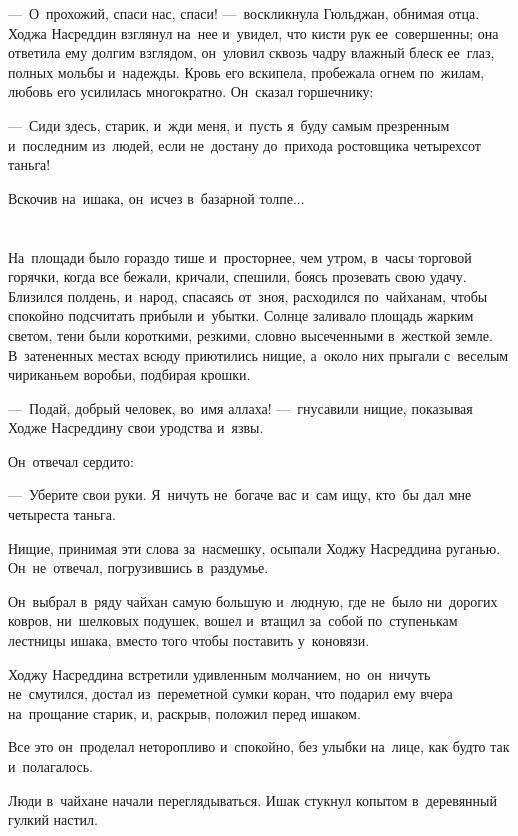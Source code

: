 \documentclass[12pt,a4paper]{book}
\begin{document}
—~О~прохожий, спаси нас, спаси! —~воскликнула Гюльджан, обнимая отца. Ходжа Насреддин взглянул на~нее и~увидел, что кисти рук ее~совершенны; она ответила ему долгим взглядом, он~уловил сквозь чадру влажный блеск ее~глаз, полных мольбы и~надежды. Кровь его вскипела, пробежала огнем по~жилам, любовь его усилилась многократно. Он~сказал горшечнику:

—~Сиди здесь, старик, и~жди меня, и~пусть я~буду самым презренным и~последним из~людей, если не~достану до~прихода ростовщика четырехсот таньга!

Вскочив на~ишака, он~исчез в~базарной толпе...


\chapter{}

На~площади было гораздо тише и~просторнее, чем утром, в~часы торговой горячки, когда все бежали, кричали, спешили, боясь прозевать свою удачу. Близился полдень, и~народ, спасаясь от~зноя, расходился по~чайханам, чтобы спокойно подсчитать прибыли и~убытки. Солнце заливало площадь жарким светом, тени были короткими, резкими, словно высеченными в~жесткой земле. В~затененных местах всюду приютились нищие, а~около них прыгали с~веселым чириканьем воробьи, подбирая крошки.

—~Подай, добрый человек, во~имя аллаха! —~гнусавили нищие, показывая Ходже Насреддину свои уродства и~язвы.

Он~отвечал сердито:

—~Уберите свои руки. Я~ничуть не~богаче вас и~сам ищу, кто~бы дал мне четыреста таньга.

Нищие, принимая эти слова за~насмешку, осыпали Ходжу Насреддина руганью. Он~не~отвечал, погрузившись в~раздумье.

Он~выбрал в~ряду чайхан самую большую и~людную, где не~было ни~дорогих ковров, ни~шелковых подушек, вошел и~втащил за~собой по~ступенькам лестницы ишака, вместо того чтобы поставить у~коновязи.

Ходжу Насреддина встретили удивленным молчанием, но~он~ничуть не~смутился, достал из~переметной сумки коран, что подарил ему вчера на~прощание старик, и, раскрыв, положил перед ишаком.

Все это он~проделал неторопливо и~спокойно, без улыбки на~лице, как будто так и~полагалось.

Люди в~чайхане начали переглядываться. Ишак стукнул копытом в~деревянный гулкий настил.
\end{document}
